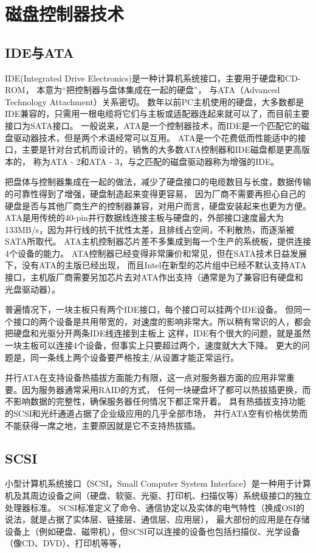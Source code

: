 \section{磁盘控制器技术}


\subsection{IDE与ATA}
IDE(Integrated Drive Electronics)是一种计算机系统接口，主要用于硬盘和CD-ROM，
本意为“把控制器与盘体集成在一起的硬盘”，
与ATA（Advanced Technology Attachment）关系密切。
数年以前PC主机使用的硬盘，大多数都是IDE兼容的，只需用一根电缆将它们与主板或适配器连起来就可以了，而目前主要接口为SATA接口。
一般说来，ATA是一个控制器技术，而IDE是一个匹配它的磁盘驱动器技术，但是两个术语经常可以互用。
ATA是一个花费低而性能适中的接口，主要是针对台式机而设计的，销售的大多数ATA控制器和IDE磁盘都是更高版本的，
称为ATA - 2和ATA - 3，与之匹配的磁盘驱动器称为增强的IDE。


把盘体与控制器集成在一起的做法，减少了硬盘接口的电缆数目与长度，数据传输的可靠性得到了增强，硬盘制造起来变得更容易，
因为厂商不需要再担心自己的硬盘是否与其他厂商生产的控制器兼容，对用户而言，硬盘安装起来也更为方便。
ATA是用传统的40-pin并行数据线连接主板与硬盘的，外部接口速度最大为133MB/s，因为并行线的抗干扰性太差，且排线占空间，不利散热，而逐渐被SATA所取代。
ATA主机控制器芯片差不多集成到每一个生产的系统板，提供连接4个设备的能力。
ATA控制器已经变得非常廉价和常见，但在SATA技术日益发展下，没有ATA的主版已经出现，
而且Intel在新型的芯片组中已经不默认支持ATA接口，主机版厂商需要另加芯片去对ATA作出支持（通常是为了兼容旧有硬盘和光盘驱动器）。

普遍情况下，一块主板只有两个IDE接口，每个接口可以挂两个IDE设备。
但同一个接口的两个设备是共用带宽的，对速度的影响非常大。所以稍有常识的人，都会把硬盘和光驱分开两条IDE线连接到主板上 
这样，IDE有个很大的问题，就是虽然一块主板可以连接4个设备，但事实上只要超过两个，速度就大大下降。
更大的问题是，同一条线上两个设备要严格按主/从设置才能正常运行。

并行ATA在支持设备热插拔方面能力有限，这一点对服务器方面的应用非常重要。因为服务器通常采用RAID的方式，
任何一块硬盘坏了都可以热拔插更换，而不影响数据的完整性，确保服务器任何情况下都正常开着。
具有热插拔支持功能的SCSI和光纤通道占据了企业级应用的几乎全部市场，
并行ATA空有价格优势而不能获得一席之地，主要原因就是它不支持热拔插。 


\subsection{SCSI}
小型计算机系统接口（SCSI，Small Computer System Interface）是一种用于计算机及其周边设备之间（硬盘、软驱、光驱、打印机、扫描仪等）系统级接口的独立处理器标准。
SCSI标准定义了命令、通信协定以及实体的电气特性（换成OSI的说法，就是占据了实体层、链接层、通信层、应用层），
最大部份的应用是在存储设备上（例如硬盘、磁带机），但SCSI可以连接的设备也包括扫描仪、光学设备（像CD、DVD）、打印机等等，

